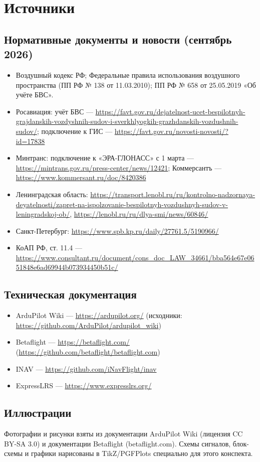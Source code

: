 \section*{Источники}

\subsection*{Нормативные документы и новости (сентябрь 2026)}
\begin{itemize}\small
\item Воздушный кодекс РФ; Федеральные правила использования воздушного пространства (ПП РФ № 138 от 11.03.2010); ПП РФ № 658 от 25.05.2019 «Об учёте БВС».
\item Росавиация: учёт БВС — \url{https://favt.gov.ru/dejatelnost-ucet-bespilotnyh-grajdanskih-vozdyshnih-sudov-i-sverkhlyogkih-grazhdanskih-vozdushnih-sudov/}; подключение к ГИС — \url{https://favt.gov.ru/novosti-novosti/?id=17838}
\item Минтранс: подключение к «ЭРА-ГЛОНАСС» с 1 марта — \url{https://mintrans.gov.ru/press-center/news/12421}; Коммерсантъ — \url{https://www.kommersant.ru/doc/8420386}
\item Ленинградская область: \url{https://transport.lenobl.ru/ru/kontrolno-nadzornaya-deyatelnosti/zapret-na-ispolzovanie-bespilotnyh-vozdushnyh-sudov-v-leningradskoj-ob/}, \url{https://lenobl.ru/ru/dlya-smi/news/60846/}
\item Санкт-Петербург: \url{https://www.spb.kp.ru/daily/27761.5/5190966/}
\item КоАП РФ, ст. 11.4 — \url{https://www.consultant.ru/document/cons_doc_LAW_34661/bba564e67e0651848e6ad69944b073934450b51c/}
\end{itemize}

\subsection*{Техническая документация}
\begin{itemize}\small
\item ArduPilot Wiki — \url{https://ardupilot.org/} (исходники: \url{https://github.com/ArduPilot/ardupilot_wiki})
\item Betaflight — \url{https://betaflight.com/} (\url{https://github.com/betaflight/betaflight.com})
\item INAV — \url{https://github.com/iNavFlight/inav}
\item ExpressLRS — \url{https://www.expresslrs.org/}
\end{itemize}

\subsection*{Иллюстрации}
{\small Фотографии и рисунки взяты из документации ArduPilot Wiki (лицензия CC BY-SA 3.0) и документации Betaflight (betaflight.com). Схемы сигналов, блок-схемы и графики нарисованы в TikZ/PGFPlots специально для этого конспекта.}
